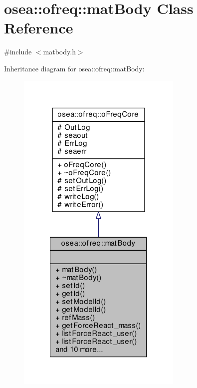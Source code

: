 \hypertarget{classosea_1_1ofreq_1_1mat_body}{\section{osea\-:\-:ofreq\-:\-:mat\-Body Class Reference}
\label{classosea_1_1ofreq_1_1mat_body}
}


{\ttfamily \#include $<$matbody.\-h$>$}



Inheritance diagram for osea\-:\-:ofreq\-:\-:mat\-Body\-:
\nopagebreak
\begin{figure}[H]
\begin{center}
\leavevmode
\includegraphics[width=224pt]{classosea_1_1ofreq_1_1mat_body__inherit__graph}
\end{center}
\end{figure}
